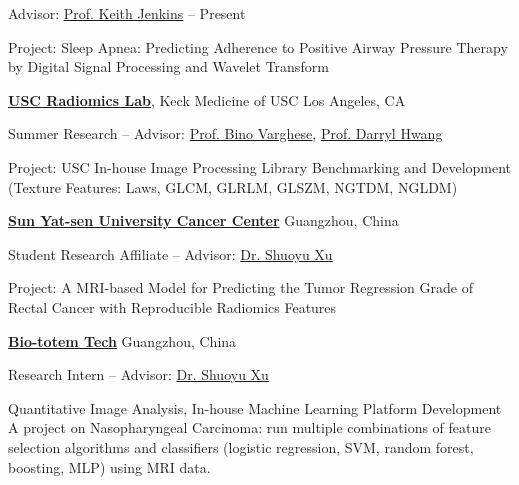 \documentclass[letterpaper,MMMyyyy,nonstopmode]{simpleresumecv}
\begin{document}
\begin{Body}
\Gap
\Item
Advisor:
\href{https://viterbi.usc.edu/directory/faculty/Jenkins/Brian}
{Prof. Keith Jenkins}
\hfill
{} --
Present
\begin{Detail}
\SubBulletItem
Project:
Sleep Apnea: Predicting Adherence to Positive Airway Pressure Therapy by Digital Signal Processing and Wavelet Transform
\end{Detail}

\Entry
\href{http://radiomicslab.usc.edu/}
{\textbf{USC Radiomics Lab}},
Keck Medicine of USC
\hfill
Los Angeles, CA

\Gap
\Item
Summer Research
\hfill
{} --
\Item
Advisor:
\href{https://sites.google.com/view/radiomicslabatusc/people?authuser=0}
{Prof. Bino Varghese},
\href{https://sites.google.com/view/radiomicslabatusc/people?authuser=0}
{Prof. Darryl Hwang}
\begin{Detail}
\SubBulletItem
Project:
USC In-house Image Processing Library Benchmarking and Development (Texture Features: Laws, GLCM, GLRLM, GLSZM, NGTDM, NGLDM)
\end{Detail}

\Entry
\href{http://english.sysucc.org.cn/}
{\textbf{Sun Yat-sen University Cancer Center}}
\hfill
Guangzhou, China

\Gap
\Item
Student Research Affiliate
\hfill
{} --
\Item
Advisor:
\href{https://scholar.google.com/citations?user=QDnsWToAAAAJ&hl=en}
{Dr. Shuoyu Xu}
\begin{Detail}
\SubBulletItem
Project:
A MRI-based Model for Predicting the Tumor Regression Grade of Rectal Cancer with Reproducible Radiomics Features
\end{Detail}

\Entry
\href{http://www.bio-totem.com/en/}
{\textbf{Bio-totem Tech}}
\hfill
Guangzhou, China

\Gap
\Item
Research Intern
\hfill
{} --
\Item
Advisor:
\href{https://scholar.google.com/citations?user=QDnsWToAAAAJ&hl=en}
{Dr. Shuoyu Xu}
\begin{Detail}
\SubBulletItem
Quantitative Image Analysis, In-house Machine Learning Platform Development
\SubBulletItem
A project on Nasopharyngeal Carcinoma: run multiple combinations of feature selection algorithms and classifiers (logistic regression, SVM, random forest, boosting, MLP) using MRI data.
\end{Detail}


\end{Body}
\end{document}
